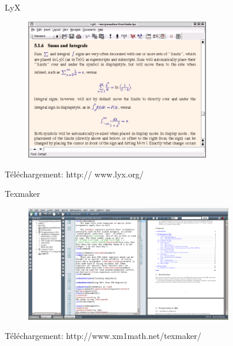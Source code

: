 \documentclass{beamer}
\begin{document}
\begin{frame}{LyX}

\begin{figure} %
\centering %
\includegraphics[width=8cm]{img/LyXScreen_Linux_en} %
\end{figure} %

{\footnotesize Téléchargement: http:// 	www.lyx.org/ }

\end{frame}



\begin{frame}{Texmaker}

\begin{figure} %
\centering %
\includegraphics[width=9cm]{img/TexmakerView} %
\end{figure} %

{\footnotesize Téléchargement: http://www.xm1math.net/texmaker/ }

\end{frame}
\end{document}
